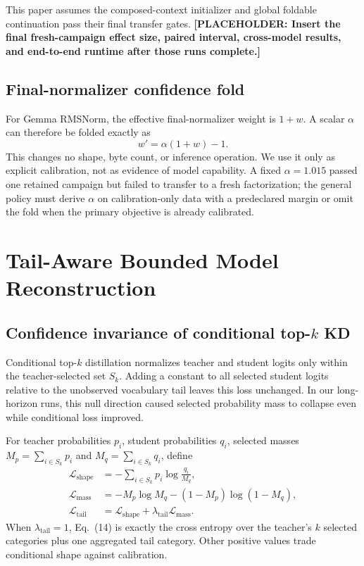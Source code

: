 \documentclass[10pt]{article}
\newcommand{\placeholder}[1]{\textcolor{red!70!black}{\textbf{[PLACEHOLDER: #1]}}}
\begin{document}
This paper assumes the composed-context initializer and global foldable
continuation pass their final transfer gates. \placeholder{Insert the final
fresh-campaign effect size, paired interval, cross-model results, and end-to-end
runtime after those runs complete.}

\subsection{Final-normalizer confidence fold}

For Gemma RMSNorm, the effective final-normalizer weight is $1+w$. A scalar
$\alpha$ can therefore be folded exactly as
\[
 w' = \alpha(1+w)-1.
 \tag{13}
\]
This changes no shape, byte count, or inference operation. We use it only as
explicit calibration, not as evidence of model capability. A fixed
$\alpha=1.015$ passed one retained campaign but failed to transfer to a fresh
factorization; the general policy must derive $\alpha$ on calibration-only
data with a predeclared margin or omit the fold when the primary objective is
already calibrated.

\section{Tail-Aware Bounded Model Reconstruction}

\subsection{Confidence invariance of conditional top-$k$ KD}

Conditional top-$k$ distillation normalizes teacher and student logits only
within the teacher-selected set $S_k$. Adding a constant to all selected
student logits relative to the unobserved vocabulary tail leaves this loss
unchanged. In our long-horizon runs, this null direction caused selected
probability mass to collapse even while conditional loss improved.

For teacher probabilities $p_i$, student probabilities $q_i$, selected masses
$M_p=\sum_{i\in S_k}p_i$ and $M_q=\sum_{i\in S_k}q_i$, define
\[
\begin{aligned}
 \mathcal L_{\mathrm{shape}}
   &= -\sum_{i\in S_k}p_i\log\frac{q_i}{M_q},\\
 \mathcal L_{\mathrm{mass}}
   &= -M_p\log M_q -(1-M_p)\log(1-M_q),\\
 \mathcal L_{\mathrm{tail}}
   &= \mathcal L_{\mathrm{shape}}+\lambda_{\mathrm{tail}}
      \mathcal L_{\mathrm{mass}}.
\end{aligned}
\tag{14}
\]
When $\lambda_{\mathrm{tail}}=1$, Eq.~(14) is exactly the cross
entropy over the teacher's $k$ selected categories plus one aggregated tail
category. Other positive values trade conditional shape against calibration.
\end{document}
